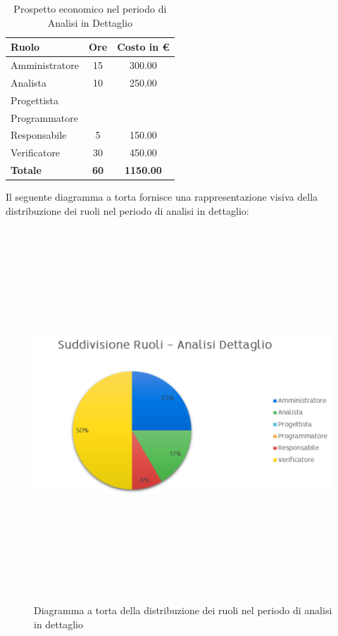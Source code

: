             \begin{table}[htbp]
                \centering
                    \begin{tabular}{| l c c |}
                        \hline
                        \textbf{Ruolo} & \textbf{Ore} & \textbf{Costo in €}\\
                        \hline
                        Amministratore & 15 & 300.00\\
                        Analista & 10 & 250.00\\
                        Progettista & & \\
                        Programmatore & & \\
                        Responsabile & 5 & 150.00\\
                        Verificatore & 30 & 450.00\\
                        \hline
                        \textbf{Totale} & \textbf{60} & \textbf{1150.00}\\
                        \hline
                    \end{tabular}
                \caption[Analisi in dettaglio - Prospetto economico]{Prospetto economico nel periodo di Analisi in Dettaglio}
            \end{table}

Il seguente diagramma a torta fornisce una rappresentazione visiva della distribuzione dei ruoli nel periodo di analisi in dettaglio:

\begin{figure}[htbp]
\centering
\includegraphics[width=14cm,height=14cm,keepaspectratio]{./img/ProspettoOrario/SRAnalisiDettaglio.png}
\caption[Analisi dettaglio - Diagramma a torta suddivisione ruoli]{Diagramma a torta della distribuzione dei ruoli nel periodo di analisi in dettaglio}
\end{figure}

